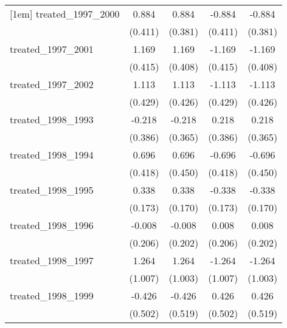 {\begin{tabular}{l*{4}{c}}
[1em]
treated\_1997\_2000&       0.884\sym{*}  &       0.884\sym{*}  &      -0.884\sym{*}  &      -0.884\sym{*}  \\
            &     (0.411)         &     (0.381)         &     (0.411)         &     (0.381)         \\
[1em]
treated\_1997\_2001&       1.169\sym{**} &       1.169\sym{**} &      -1.169\sym{**} &      -1.169\sym{**} \\
            &     (0.415)         &     (0.408)         &     (0.415)         &     (0.408)         \\
[1em]
treated\_1997\_2002&       1.113\sym{**} &       1.113\sym{**} &      -1.113\sym{**} &      -1.113\sym{**} \\
            &     (0.429)         &     (0.426)         &     (0.429)         &     (0.426)         \\
[1em]
treated\_1998\_1993&      -0.218         &      -0.218         &       0.218         &       0.218         \\
            &     (0.386)         &     (0.365)         &     (0.386)         &     (0.365)         \\
[1em]
treated\_1998\_1994&       0.696         &       0.696         &      -0.696         &      -0.696         \\
            &     (0.418)         &     (0.450)         &     (0.418)         &     (0.450)         \\
[1em]
treated\_1998\_1995&       0.338         &       0.338\sym{*}  &      -0.338         &      -0.338\sym{*}  \\
            &     (0.173)         &     (0.170)         &     (0.173)         &     (0.170)         \\
[1em]
treated\_1998\_1996&      -0.008         &      -0.008         &       0.008         &       0.008         \\
            &     (0.206)         &     (0.202)         &     (0.206)         &     (0.202)         \\
[1em]
treated\_1998\_1997&       1.264         &       1.264         &      -1.264         &      -1.264         \\
            &     (1.007)         &     (1.003)         &     (1.007)         &     (1.003)         \\
[1em]
treated\_1998\_1999&      -0.426         &      -0.426         &       0.426         &       0.426         \\
            &     (0.502)         &     (0.519)         &     (0.502)         &     (0.519)         \\

\end{tabular}}
